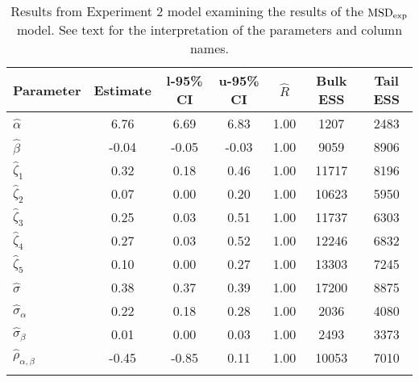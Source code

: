 \begin{table}

\caption{Results from Experiment 2 model examining the results of the $\operatorname{MSD}_{\text{exp}}$ model. \label{tab:Experiment 2-MSD}See text for the interpretation of the parameters and column names.}

\begin{tabular}{l *3{S[table-format=-1.2]} S[table-format=1.2] *2{S[table-format=5.0]}}
\lsptoprule
Parameter & {Estimate} & {l-95\% CI} & {u-95\% CI} & {$\hat{R}$} & {Bulk ESS} & {Tail ESS}\\
\midrule
$\hat\alpha$ & 6.76 & 6.69 & 6.83 & 1.00 & 1207 & 2483\\
$\hat\beta$ & -0.04 & -0.05 & -0.03 & 1.00 & 9059 & 8906\\
$\hat\zeta_{1}$ & 0.32 & 0.18 & 0.46 & 1.00 & 11717 & 8196\\
$\hat\zeta_{2}$ & 0.07 & 0.00 & 0.20 & 1.00 & 10623 & 5950\\
$\hat\zeta_{3}$ & 0.25 & 0.03 & 0.51 & 1.00 & 11737 & 6303\\
$\hat\zeta_{4}$ & 0.27 & 0.03 & 0.52 & 1.00 & 12246 & 6832\\
$\hat\zeta_{5}$ & 0.10 & 0.00 & 0.27 & 1.00 & 13303 & 7245\\
$\hat\sigma$ & 0.38 & 0.37 & 0.39 & 1.00 & 17200 & 8875\\
$\hat\sigma_{\alpha}$ & 0.22 & 0.18 & 0.28 & 1.00 & 2036 & 4080\\
$\hat\sigma_{\beta}$ & 0.01 & 0.00 & 0.03 & 1.00 & 2493 & 3373\\
$\hat\rho_{\alpha,\beta}$ & -0.45 & -0.85 & 0.11 & 1.00 & 10053 & 7010\\
\lspbottomrule
\end{tabular}

\end{table}






